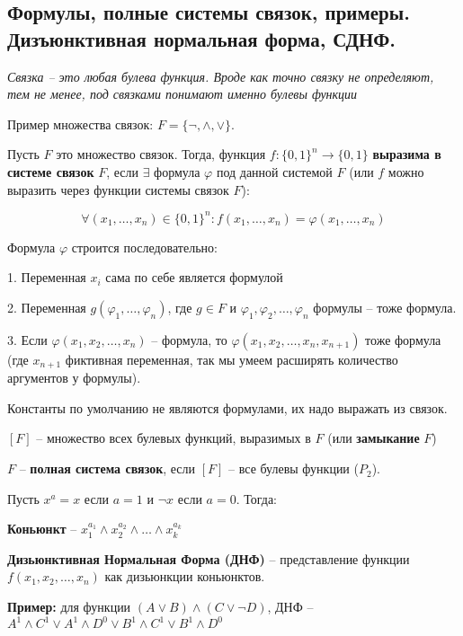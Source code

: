 \subsection{Формулы, полные системы связок, примеры. Дизъюнктивная нормальная форма, СДНФ.}

\textit{Связка -- это любая булева функция. Вроде как точно связку не определяют, тем не менее, под связками понимают именно булевы функции}

Пример множества связок: $F = \{\neg, \wedge, \vee\}$.

Пусть $F$ это множество связок. Тогда, функция $f: \{0, 1\}^n \rightarrow \{0, 1\}$ \textbf{выразима в системе связок} $F$, если $\exists$ формула $\varphi$ под данной системой $F$ (или $f$ можно выразить через функции системы связок $F$):

$$\forall (x_1, \ldots, x_n) \in \{0, 1\}^n: f(x_1, \ldots, x_n) = \varphi(x_1, \ldots, x_n)$$

Формула $\varphi$ строится последовательно:

\hspace{0.5cm}\parbox{11cm}{
       1. Переменная $x_i$ сама по себе является формулой

       2. Переменная $g(\varphi_1, \ldots, \varphi_n)$, где $g \in F$ и $\varphi_1, \varphi_2, \ldots, \varphi_n$ формулы -- тоже формула.

       3. Если $\varphi(x_1, x_2, \ldots, x_n)$ -- формула, то $\varphi(x_1, x_2, \ldots, x_n, x_{n + 1})$ тоже формула (где $x_{n + 1}$ фиктивная переменная, так мы умеем расширять количество аргументов у формулы).
}

   Константы по умолчанию не являются формулами, их надо выражать из связок.

   $[F]$ -- множество всех булевых функций, выразимых в $F$ (или \textbf{замыкание} $F$)

   $F$ -- \textbf{полная система связок}, если $[F]$ -- все булевы функции ($P_2$).

   Пусть $x^a = x$ если $a = 1$ и $\neg x$ если $a = 0$. Тогда:

   \textbf{Коньюнкт} -- $x_1^{a_1} \wedge x_2^{a_2} \wedge \ldots \wedge x_k^{a_k}$
   
   \textbf{Дизьюнктивная Нормальная Форма (ДНФ)} -- представление функции $f(x_1, x_2, \ldots, x_n)$ как дизьюнкции коньюнктов.

   \textbf{Пример:} для функции $(A \vee B) \wedge (C \vee \neg D)$, ДНФ -- $A^1 \wedge C^1 \vee A^1 \wedge D^{0} \vee B^1 \wedge C^1 \vee B^1 \wedge D^{0}$
